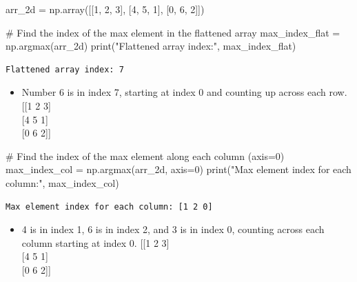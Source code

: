 \documentclass[
  letterpaper,
  DIV=11,
  numbers=noendperiod]{scrreprt}
\newenvironment{Shaded}{\begin{snugshade}}{\end{snugshade}}
\newcommand{\BuiltInTok}[1]{\textcolor[rgb]{0.00,0.23,0.31}{#1}}
\newcommand{\CommentTok}[1]{\textcolor[rgb]{0.37,0.37,0.37}{#1}}
\newcommand{\DecValTok}[1]{\textcolor[rgb]{0.68,0.00,0.00}{#1}}
\newcommand{\NormalTok}[1]{\textcolor[rgb]{0.00,0.23,0.31}{#1}}
\newcommand{\OperatorTok}[1]{\textcolor[rgb]{0.37,0.37,0.37}{#1}}
\newcommand{\StringTok}[1]{\textcolor[rgb]{0.13,0.47,0.30}{#1}}
\providecommand{\tightlist}{%
  \setlength{\itemsep}{0pt}\setlength{\parskip}{0pt}}\usepackage{longtable,booktabs,array}
\begin{document}
\begin{Shaded}
\begin{Highlighting}[]
\NormalTok{arr\_2d }\OperatorTok{=}\NormalTok{ np.array([[}\DecValTok{1}\NormalTok{, }\DecValTok{2}\NormalTok{, }\DecValTok{3}\NormalTok{], [}\DecValTok{4}\NormalTok{, }\DecValTok{5}\NormalTok{, }\DecValTok{1}\NormalTok{], [}\DecValTok{0}\NormalTok{, }\DecValTok{6}\NormalTok{, }\DecValTok{2}\NormalTok{]])}

\CommentTok{\# Find the index of the max element in the flattened array}
\NormalTok{max\_index\_flat }\OperatorTok{=}\NormalTok{ np.argmax(arr\_2d)}
\BuiltInTok{print}\NormalTok{(}\StringTok{"Flattened array index:"}\NormalTok{, max\_index\_flat)}
\end{Highlighting}
\end{Shaded}

\begin{verbatim}
Flattened array index: 7
\end{verbatim}

\begin{itemize}
\tightlist
\item
  Number 6 is in index 7, starting at index 0 and counting up across
  each row.\\
  {[}{[}1 2 3{]}\\
  {[}4 5 1{]}\\
  {[}0 6 2{]}{]}
\end{itemize}

\begin{Shaded}
\begin{Highlighting}[]
\CommentTok{\# Find the index of the max element along each column (axis=0)}
\NormalTok{max\_index\_col }\OperatorTok{=}\NormalTok{ np.argmax(arr\_2d, axis}\OperatorTok{=}\DecValTok{0}\NormalTok{)}
\BuiltInTok{print}\NormalTok{(}\StringTok{"Max element index for each column:"}\NormalTok{, max\_index\_col)}
\end{Highlighting}
\end{Shaded}

\begin{verbatim}
Max element index for each column: [1 2 0]
\end{verbatim}

\begin{itemize}
\tightlist
\item
  4 is in index 1, 6 is in index 2, and 3 is in index 0, counting across
  each column starting at index 0. {[}{[}1 2 3{]}\\
  {[}4 5 1{]}\\
  {[}0 6 2{]}{]}
\end{itemize}
\end{document}
